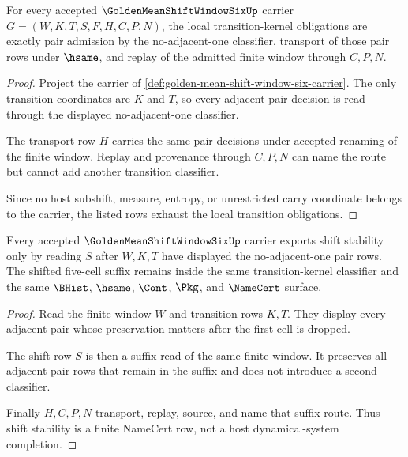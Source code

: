 \begin{theorem}
\label{thm:golden-mean-shift-window-six-transition-kernel-obligations}
For every accepted $\GoldenMeanShiftWindowSixUp$ carrier $G=(W,K,T,S,F,H,C,P,N)$, the local transition-kernel obligations are exactly pair admission by the no-adjacent-one classifier, transport of those pair rows under $\hsame$, and replay of the admitted finite window through $C,P,N$.
\end{theorem}
\begin{proof}
Project the carrier of \autoref{def:golden-mean-shift-window-six-carrier}. The only transition coordinates are $K$ and $T$, so every adjacent-pair decision is read through the displayed no-adjacent-one classifier.

The transport row $H$ carries the same pair decisions under accepted renaming of the finite window. Replay and provenance through $C,P,N$ can name the route but cannot add another transition classifier.

Since no host subshift, measure, entropy, or unrestricted carry coordinate belongs to the carrier, the listed rows exhaust the local transition obligations.
\end{proof}

\begin{theorem}
\label{thm:golden-mean-shift-window-six-shift-stability}
Every accepted $\GoldenMeanShiftWindowSixUp$ carrier exports shift stability only by reading $S$ after $W,K,T$ have displayed the no-adjacent-one pair rows. The shifted five-cell suffix remains inside the same transition-kernel classifier and the same $\BHist$, $\hsame$, $\Cont$, $\Pkg$, and $\NameCert$ surface.
\end{theorem}
\begin{proof}
Read the finite window $W$ and transition rows $K,T$. They display every adjacent pair whose preservation matters after the first cell is dropped.

The shift row $S$ is then a suffix read of the same finite window. It preserves all adjacent-pair rows that remain in the suffix and does not introduce a second classifier.

Finally $H,C,P,N$ transport, replay, source, and name that suffix route. Thus shift stability is a finite NameCert row, not a host dynamical-system completion.
\end{proof}

